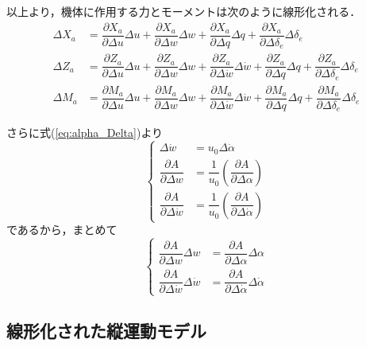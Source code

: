 以上より，機体に作用する力とモーメントは次のように線形化される．
\begin{align}
  \Delta X_a &= \dfrac{\partial X_a}{\partial \Delta u}\Delta u
  + \dfrac{\partial X_a}{\partial \Delta w}\Delta w
  + \dfrac{\partial X_a}{\partial \Delta q}\Delta q
  + \dfrac{\partial X_a}{\partial \Delta \delta_e}\Delta \delta_e  \\
  \Delta Z_a &= \dfrac{\partial Z_a}{\partial \Delta u}\Delta u
  + \dfrac{\partial Z_a}{\partial \Delta w}\Delta w
  + \dfrac{\partial Z_a}{\partial \Delta \dot{w}}\Delta \dot{w}
  + \dfrac{\partial Z_a}{\partial \Delta q}\Delta q
  + \dfrac{\partial Z_a}{\partial \Delta \delta_e}\Delta \delta_e \\
  \Delta M_a &= \dfrac{\partial M_a}{\partial \Delta u}\Delta u
  + \dfrac{\partial M_a}{\partial \Delta w}\Delta w
  + \dfrac{\partial M_a}{\partial \Delta \dot{w}}\Delta \dot{w}
  + \dfrac{\partial M_a}{\partial \Delta q}\Delta q
  + \dfrac{\partial M_a}{\partial \Delta \delta_e}\Delta \delta_e
\end{align}

さらに式(\ref{eq:alpha_Delta})より
\begin{equation}
  \left\{
  \begin{align}
    \Delta \dot{w} &= u_0 \Delta \dot{\alpha} \\
    \dfrac{\partial A}{\partial \Delta w} &= \dfrac{1}{u_0}\left(\dfrac{\partial A}{\partial \Delta \alpha}\right) \\
    \dfrac{\partial A}{\partial \Delta \dot{w}} &= \dfrac{1}{u_0}\left(\dfrac{\partial A}{\partial \Delta \dot{\alpha}}\right)
  \end{align}
\end{equation}
であるから，まとめて
\begin{equation}
  \left\{
  \begin{align}
    \dfrac{\partial A}{\partial \Delta w}\Delta w &= \dfrac{\partial A}{\partial \Delta \alpha}\Delta\alpha \\
    \dfrac{\partial A}{\partial \Delta \dot{w}}\Delta \dot{w} &= \dfrac{\partial A}{\partial \Delta \dot{\alpha}}\Delta\dot{\alpha}
  \end{align}
  \label{eq:w_to_alpha}
\end{equation}

\subsection{線形化された縦運動モデル}
\label{sec:linear}

